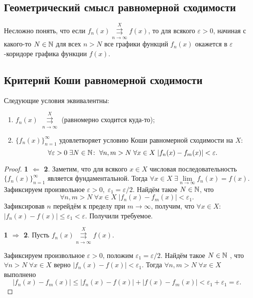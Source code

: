 \documentclass[a4paper, 12pt]{article}
\begin{document}
	\subsection{Геометрический смысл равномерной сходимости}
	Несложно понять, что если $f_n(x) \overset{X}{\underset{n\to\infty}{\rightrightarrows}} f(x)$, то для всякого $\varepsilon > 0$, начиная с какого-то $N\in \mathbb{N}$ для всех $n>N$ все графики функций $f_n(x)$ окажется в $\varepsilon$-коридоре графика функции $f(x)$.
	\subsection{Критерий Коши равномерной сходимости}
	\begin{Theorem}
		Следующие условия эквивалентны:
		\begin{enumerate}
			\item $f_n(x)$ $\overset{X}{\underset{n\to\infty}{\rightrightarrows}}$ (равномерно сходится куда-то);
			\item $\{f_n(x)\}_{n=1}^\infty$ удовлетворяет условию Коши равномерной сходимости на $X$:
			$$
			\forall \varepsilon > 0\; \exists N\in\mathbb{N}\colon \; \forall n,m>N\; \forall x\in X\; |f_n(x) - f_m(x)| < \varepsilon.
			$$
		\end{enumerate}
	\end{Theorem}
	\begin{proof}
		\par \textbf{1 $\Leftarrow$ 2}. Заметим, что для всякого $x\in X$ числовая последовательность $\{f_n(x)\}_{n=1}^\infty$ является фундаментальной. Тогда $\forall x\in X\; \exists \lim\limits_{n\to \infty} f_n(x) = f(x)$. Зафиксируем произвольное $\varepsilon > 0,\; \varepsilon_1 = \varepsilon / 2$. Найдём такое $N \in \mathbb{N}$, что 
		$$
			\forall n,m>N\; \forall x\in X\; |f_n(x) - f_m(x)| < \varepsilon_1.
		$$
		Зафиксировав $n$ перейдём к пределу при $m \to \infty$, получим, что $\forall x \in X:$ $|f_n(x) - f(x)| \leqslant \varepsilon_1 < \varepsilon$. Получили требуемое.
		\par \textbf{1 $\Rightarrow$ 2}. Пусть $f_n(x) \overset{X}{\underset{n\to\infty}{\rightrightarrows}} f(x)$.
		\par Зафиксируем произвольное $\varepsilon > 0$, положим $\varepsilon_1 = \varepsilon / 2$. Найдём такое $N\in \mathbb{N}$ , что $\forall n>N\; \forall x\in X$ верно $ |f_n(x) - f(x)| < \varepsilon_1$. Тогда $\forall n,m > N\; \forall x \in X$ выполнено
		$$
			|f_n(x) - f_m(x)| \leqslant |f_n(x) - f(x)| + |f(x) - f_m(x)| < \varepsilon_1 + \varepsilon_1 = \varepsilon.
		$$
	\end{proof}
\end{document}
